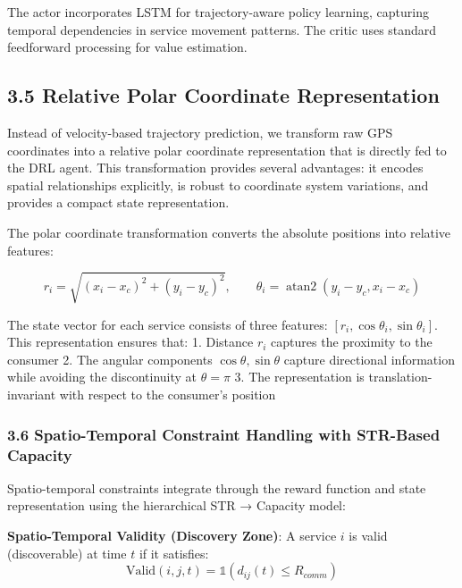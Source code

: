 The actor incorporates LSTM for trajectory-aware policy learning,
capturing temporal dependencies in service movement patterns. The critic
uses standard feedforward processing for value estimation.

\hypertarget{relative-polar-coordinate-representation}{%
	\subsection{3.5 Relative Polar Coordinate Representation}\label{relative-polar-coordinate-representation}}

Instead of velocity-based trajectory prediction, we transform raw GPS
coordinates into a relative polar coordinate representation that is
directly fed to the DRL agent. This transformation provides several
advantages: it encodes spatial relationships explicitly, is robust to
coordinate system variations, and provides a compact state
representation.

The polar coordinate transformation converts the absolute positions
into relative features:

\begin{equation*}
r_i = \sqrt{(x_i - x_c)^2 + (y_i - y_c)^2}, \qquad
\theta_i = \operatorname{atan2}(y_i - y_c, x_i - x_c)
\end{equation*}

The state vector for each service consists of three features:
\([r_i, \cos\theta_i, \sin\theta_i]\). This representation ensures that:
1. Distance \(r_i\) captures the proximity to the consumer
2. The angular components \(\cos\theta, \sin\theta\) capture directional
information while avoiding the discontinuity at \(\theta = \pi\)
3. The representation is translation-invariant with respect to the
consumer's position

\hypertarget{spatio-temporal-constraint-handling-with-str-based-capacity}{%
	\subsubsection{3.6 Spatio-Temporal Constraint Handling with STR-Based
		Capacity}\label{spatio-temporal-constraint-handling-with-str-based-capacity}}

Spatio-temporal constraints integrate through the reward function and
state representation using the hierarchical STR → Capacity model:

\textbf{Spatio-Temporal Validity (Discovery Zone)}: A service \(i\) is
valid (discoverable) at time \(t\) if it satisfies:
\[\text{Valid}(i, j, t) = \mathbb{1}(d_{ij}(t) \leq R_{comm})\]

